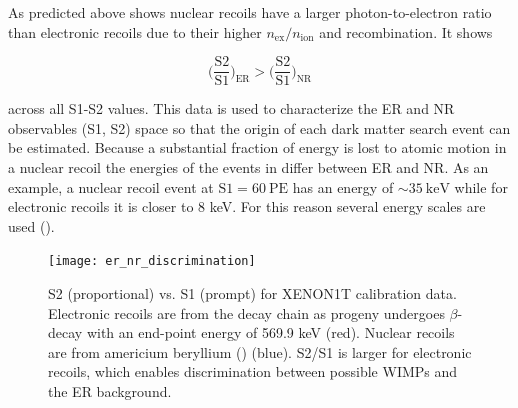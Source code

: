 As predicted above  shows nuclear recoils have a larger photon-to-electron ratio than electronic recoils due
to their higher $n_{\mathrm{ex}}/n_{\mathrm{ion}}$ and recombination.  It shows

\begin{equation}
\bigg( \frac{\mathrm{S}2}{\mathrm{S}1} \bigg)_{\mathrm{ER}} > \bigg( \frac{\mathrm{S}2}{\mathrm{S}1} \bigg)_{\mathrm{NR}}
\end{equation}

\noindent across all S1-S2 values.  This data is used to characterize the ER and NR observables (S1, S2) space so that the origin of each
dark
matter search event can be estimated.  Because a substantial fraction of energy is lost to atomic motion in a nuclear recoil the energies
of the events in  differ between ER and NR.  As an example, a nuclear recoil event at
$\mathrm{S1} = 60\ \mathrm{PE}$ has an energy of ${\sim}35\ \mathrm{keV}$ while for electronic recoils it is closer to 8 keV.  For this
reason several energy scales are used ().

\begin{figure}
\centering
\texttt{[image: er\_nr\_discrimination]}
\caption{S2 (proportional) vs. S1 (prompt) for XENON1T calibration data.  Electronic recoils are from the  decay chain as
progeny  undergoes $\beta$-decay with an end-point energy of 569.9 keV (red).  Nuclear
recoils are from americium beryllium () (blue).  S2/S1 is larger for electronic recoils, which enables discrimination
between possible WIMPs and the ER background.}
\label{fig:tpcs_signals_ernr}
\end{figure}

